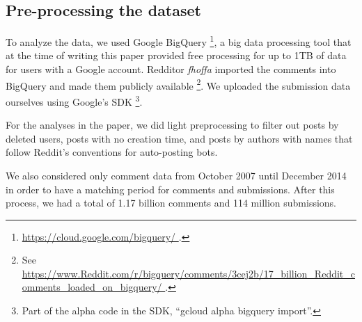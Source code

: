 \subsection{Pre-processing the dataset}

To analyze the data, we used Google BigQuery \footnote{\url{https://cloud.google.com/bigquery/ }.}, a big data processing tool that at the time of writing this paper provided free processing for up to 1TB of data for users with a Google account.  Redditor \textit{fhoffa} imported the comments into BigQuery and made them publicly available \footnote{See \url{https://www.Reddit.com/r/bigquery/comments/3cej2b/17_billion_Reddit_comments_loaded_on_bigquery/ }.}.  We uploaded the submission data ourselves using Google's SDK \footnote{Part of the alpha code in the SDK, ``gcloud alpha bigquery import''.}.

For the analyses in the paper, we did light preprocessing to filter out posts by deleted users, posts with no creation time, and posts by authors with names that follow Reddit's conventions for auto-posting bots. 

%

We also considered only comment data from October 2007 until December 2014 in order to have a matching period for comments and submissions. After this process, we had a total of 1.17 billion comments and 114 million submissions.

